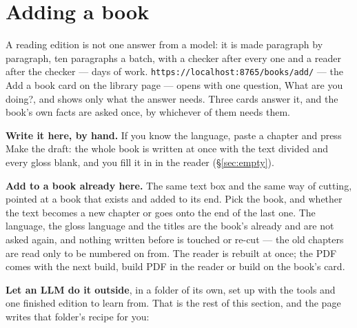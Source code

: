\documentclass[11pt,oneside]{report}
\newcommand{\menu}[1]{\textsf{#1}}
\begin{document}
\section{Adding a book}
\label{sec:addbook}

A reading edition is not one answer from a model: it is made paragraph by
paragraph, ten paragraphs a batch, with a checker after every one and a
reader after the checker --- days of work. \texttt{https://localhost:8765/books/add/}
--- the \menu{Add a book} card on the library page --- opens with one
question, \menu{What are you doing?}, and shows only what the answer needs.
Three cards answer it, and the book's own facts are asked once, by whichever
of them needs them.

\textbf{Write it here, by hand.} If you know the language, paste a chapter and
press \menu{Make the draft}: the whole book is written at once with the text
divided and every gloss blank, and you fill it in in the reader
(\S\ref{sec:empty}).

\textbf{Add to a book already here.} The same text box and the same way of
cutting, pointed at a book that exists and added to its end. Pick the book,
and whether the text becomes a new chapter or goes onto the end of the last
one. The language, the gloss
language and the titles are the book's already and are not asked again, and
nothing written before is touched or re-cut --- the old chapters are read
only to be numbered on from. The reader is rebuilt at once; the PDF comes
with the next build, \menu{build PDF} in the reader or \menu{build} on the
book's card.

\textbf{Let an LLM do it outside}, in a folder of its own, set up
with the tools and one finished edition to learn from. That is the rest of
this section, and the page writes that folder's recipe for you:
\end{document}

